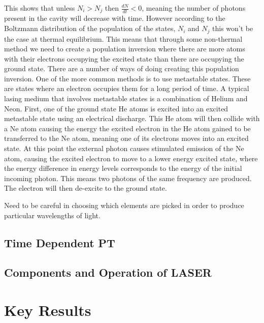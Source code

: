 \noindent This shows that unless $N_i > N_j$ then $\frac{dN}{dt} < 0$, meaning the number of photons present in the cavity will decrease with time. However according to the Boltzmann distribution of the population of the states, $N_i$ and $N_j$ this won't be the case at thermal equilibrium. This means that through some non-thermal method we need to create a population inversion where there are more atoms with their electrons occupying the excited state than there are occupying the ground state. There are a number of ways of doing creating this population inversion. One of the more common methods is to use metastable states. These are states where an electron occupies them for a long period of time. A typical lasing medium that involves metastable states is a combination of Helium and Neon. First, one of the ground state He atoms is excited into an excited metastable state using an electrical discharge. This He atom will then collide with a Ne atom causing the energy the excited electron in the He atom gained to be transferred to the Ne atom, meaning one of its electrons moves into an excited state. At this point the external photon causes stimulated emission of the Ne atom, causing the excited electron to move to a lower energy excited state, where the energy difference in energy levels corresponds to the energy of the initial incoming photon. This means two photons of the same frequency are produced. The electron will then de-excite to the ground state.

\noindent Need to be careful in choosing which elements are picked in order to produce particular wavelengths of light.

\subsection{Time Dependent PT}

\subsection{Components and Operation of LASER}

\section{Key Results}
